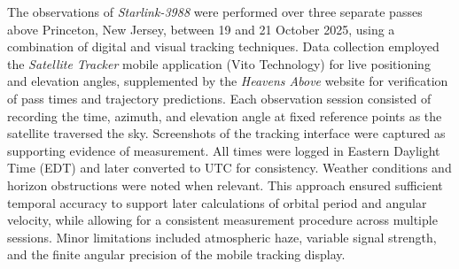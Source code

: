 \documentclass{article}
\begin{document}
The observations of \textit{Starlink-3988} were performed over three separate passes above Princeton, New Jersey, between 19 and 21 October 2025, using a combination of digital and visual tracking techniques. Data collection employed the \textit{Satellite Tracker} mobile application (Vito Technology) for live positioning and elevation angles, supplemented by the \textit{Heavens Above} website for verification of pass times and trajectory predictions. Each observation session consisted of recording the time, azimuth, and elevation angle at fixed reference points as the satellite traversed the sky. Screenshots of the tracking interface were captured as supporting evidence of measurement. All times were logged in Eastern Daylight Time (EDT) and later converted to UTC for consistency. Weather conditions and horizon obstructions were noted when relevant. This approach ensured sufficient temporal accuracy to support later calculations of orbital period and angular velocity, while allowing for a consistent measurement procedure across multiple sessions. Minor limitations included atmospheric haze, variable signal strength, and the finite angular precision of the mobile tracking display.
\end{document}
